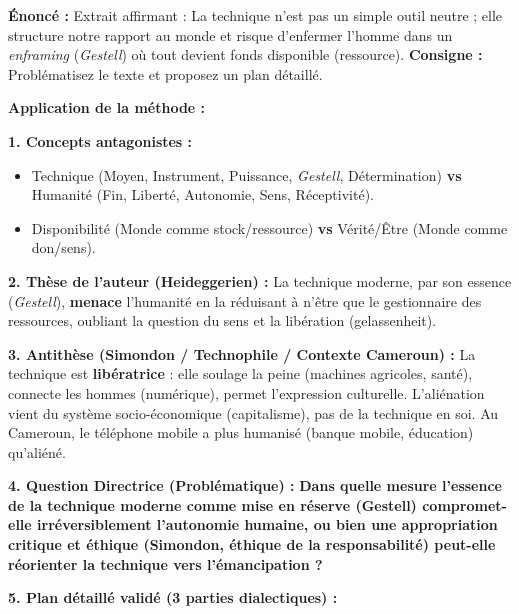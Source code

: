 \documentclass[11pt]{article}
\newcommand{\cle}[1]{{\popxbold\color{popdark}#1}}
\begin{document}
\begin{exoresolu}
\textbf{Énoncé :} Extrait affirmant : \og La technique n'est pas un simple outil neutre ; elle structure notre rapport au monde et risque d'enfermer l'homme dans un \emph{enframing} (\textit{Gestell}) où tout devient \og fonds disponible \fg (ressource). \fg
\textbf{Consigne :} \og Problématisez le texte et proposez un plan détaillé. \fg

\tcblower
\textbf{Application de la méthode :}

\textbf{1. Concepts antagonistes :}
\begin{itemize}
    \item \cle{Technique} (Moyen, Instrument, Puissance, \textit{Gestell}, Détermination) \textbf{vs} \cle{Humanité} (Fin, Liberté, Autonomie, Sens, Réceptivité).
    \item \cle{Disponibilité} (Monde comme stock/ressource) \textbf{vs} \cle{Vérité/Être} (Monde comme don/sens).
\end{itemize}

\textbf{2. Thèse de l'auteur (Heideggerien) :}
\og La technique moderne, par son essence (\textit{Gestell}), \textbf{menace} l'humanité en la réduisant à n'être que le gestionnaire des ressources, oubliant la \cle{question du sens} et la \cle{libération} (gelassenheit). \fg

\textbf{3. Antithèse (Simondon / Technophile / Contexte Cameroun) :}
\og La technique est \textbf{libératrice} : elle soulage la peine (machines agricoles, santé), connecte les hommes (numérique), permet l'expression culturelle. L'aliénation vient du \cle{système socio-économique} (capitalisme), pas de la technique en soi. Au Cameroun, le téléphone mobile a plus \og humanisé \fg (banque mobile, éducation) qu'aliéné. \fg

\textbf{4. Question Directrice (Problématique) :}
\og \textbf{Dans quelle mesure l'essence de la technique moderne comme mise en réserve (Gestell) compromet-elle irréversiblement l'autonomie humaine, ou bien une appropriation critique et éthique (Simondon, éthique de la responsabilité) peut-elle réorienter la technique vers l'émancipation ?} \fg

\textbf{5. Plan détaillé validé (3 parties dialectiques) :}


\end{exoresolu}
\end{document}
